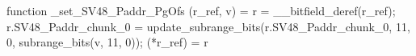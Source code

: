 function _set_SV48_Paddr_PgOfs (r_ref, v) = {
    r = __bitfield_deref(r_ref);
    r.SV48_Paddr_chunk_0 = update_subrange_bits(r.SV48_Paddr_chunk_0, 11, 0, subrange_bits(v, 11, 0));
    (*r_ref) = r
}
